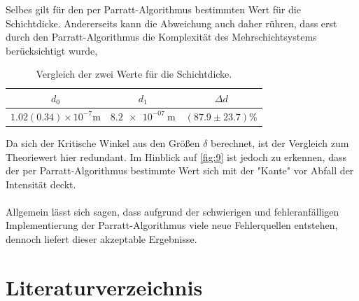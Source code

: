 \documentclass[12pt]{article}
\begin{document}
Selbes gilt für den per Parratt-Algorithmus bestimmten Wert für die Schichtdicke. Andererseits kann die Abweichung auch daher rühren, dass erst durch den Parratt-Algorithmus die Komplexität des Mehrschichtsystems berücksichtigt wurde, 
\begin{table}[H]
  \centering
  \renewcommand{\arraystretch}{1.5} %
  \caption{Vergleich der zwei Werte für die Schichtdicke.}
  \begin{tabular}{c|c|c}
    \hline
    $d_0$ & $d_1$ & $\Delta d$ \\
    \hline
    $1.02(0.34)\times 10^{-7}\si{\meter}$ & $\SI{8.2e-07}{\meter}$ & $(\num{87.9}\pm\num{23.7})\%$  \\
  \end{tabular}
  \label{tab:schichtdicke}
\end{table}
Da sich der Kritische Winkel aus den Größen $\delta$ berechnet, ist der Vergleich zum Theoriewert hier redundant.
Im Hinblick auf \autoref{fig:9} ist jedoch zu erkennen, dass der per Parratt-Algorithmus bestimmte Wert sich mit der "Kante" vor Abfall der Intensität deckt.
\\\\
Allgemein lässt sich sagen, dass aufgrund der schwierigen und fehleranfälligen Implementierung der Parratt-Algorithmus viele neue Fehlerquellen entstehen, dennoch liefert dieser akzeptable Ergebnisse.

\section{Literaturverzeichnis}\label{sec:literaturverzeichnis}
\printbibliography[heading = none]
\newpage
\end{document}
